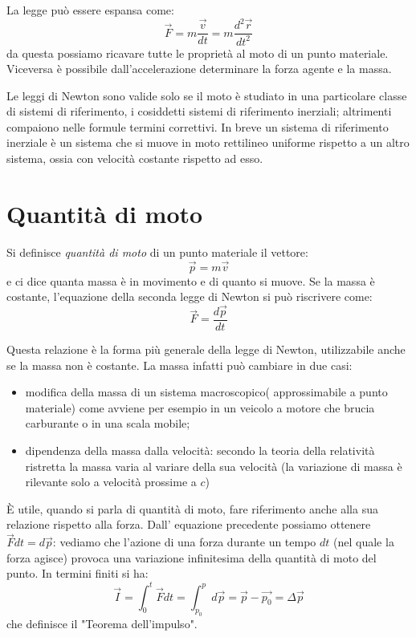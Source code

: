 \documentclass[class=book, crop=false, oneside, 12pt]{standalone}
\begin{document}
La legge può essere espansa come:
\begin{equation}
    \overrightarrow{F} = m \frac{\overrightarrow{v}}{dt} = m \frac{d^2 \overrightarrow{r}}{dt^2}
\end{equation}
da questa possiamo ricavare tutte le proprietà al moto di un punto materiale. Viceversa è possibile dall'accelerazione determinare la forza agente e la massa.

Le leggi di Newton sono valide solo se il moto è studiato in una particolare classe di sistemi di riferimento, i cosiddetti sistemi di riferimento inerziali; altrimenti compaiono nelle formule termini correttivi.
In breve un sistema di riferimento inerziale è un sistema che si muove in moto rettilineo uniforme rispetto a un altro sistema, ossia con velocità costante rispetto ad esso.

\section{Quantità di moto}
Si definisce \emph{quantità di moto} di un punto materiale il vettore:
\begin{equation}
    \overrightarrow{p} = m \overrightarrow{v}
\end{equation}
e ci dice quanta massa è in movimento e di quanto si muove.
Se la massa è costante, l'equazione della seconda legge di Newton si può riscrivere come:
\begin{equation}
    \overrightarrow{F} = \frac{d \overrightarrow{p}}{dt}
\end{equation}

Questa relazione è la forma più generale della legge di Newton, utilizzabile anche se la massa non è costante. 
La massa infatti può cambiare in due casi:
\begin{itemize}
    \item modifica della massa di un sistema macroscopico( approssimabile a punto materiale) come avviene per esempio in un veicolo a motore che brucia carburante o in una scala mobile; 
    \item dipendenza della massa dalla velocità: secondo la teoria della relatività ristretta la massa varia al variare della sua velocità (la variazione di massa è rilevante solo a velocità prossime a \(c\))
\end{itemize}

È utile, quando si parla di quantità di moto, fare riferimento anche alla sua relazione rispetto alla forza.
Dall' equazione precedente possiamo ottenere \(\overrightarrow{F} d t = d \overrightarrow{p}\): vediamo che l'azione di una forza durante un tempo \(d t\) (nel quale la forza agisce) provoca una variazione infinitesima della quantità di moto del punto. 
In termini finiti si ha:
\begin{equation}
    \overrightarrow{I} = \int_0^t \overrightarrow{F} dt = \int_{p_0}^p d \overrightarrow{p} = \overrightarrow{p}-\overrightarrow{p_0} = \Delta \overrightarrow{p}
\end{equation} che definisce il "Teorema dell'impulso".
\end{document}
